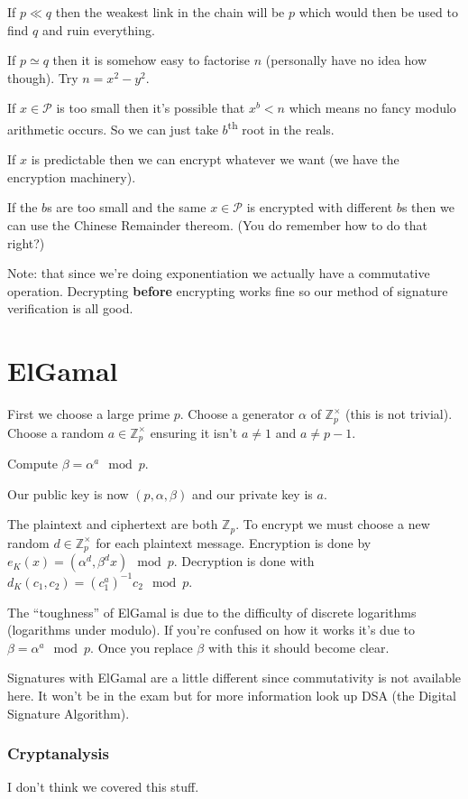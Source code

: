 \documentclass{report}
\newcommand{\ts}{\textsuperscript}
\begin{document}
If $p \ll q$ then the weakest link in the chain will be $p$ which would then be
used to find $q$ and ruin everything.

If $p \simeq q$ then it is somehow easy to factorise $n$ (personally have no
idea how though). Try $n=x^2-y^2$.

If $x \in \mathscr{P}$ is too small then it's possible that $x^b < n$ which
means no fancy modulo arithmetic occurs. So we can just take $b$\ts{th} root
in the reals.

If $x$ is predictable then we can encrypt whatever we want (we have the
encryption machinery).

If the $b$s are too small and the same $x \in \mathscr{P}$ is encrypted with
different $b$s then we can use the Chinese Remainder thereom.
(You do remember how to do that right?)

Note: that since we're doing exponentiation we actually have a commutative
operation. Decrypting \textbf{before} encrypting works fine so our method
of signature verification is all good.

\section{ElGamal}
First we choose a large prime $p$. Choose a generator $\alpha$ of
$\mathbb{Z}^\times_p$ (this is not trivial). Choose a random
$a \in \mathbb{Z}^\times_p$ ensuring it isn't $a \neq 1$ and $a \neq p-1$.

Compute $\beta = \alpha^a \mod p$.

Our public key is now $(p, \alpha, \beta)$ and our private key is $a$.

The plaintext and ciphertext are both $\mathbb{Z}_p$. To encrypt we must
choose a new random $d \in \mathbb{Z}^\times_p$ for each plaintext message.
Encryption is done by $e_K(x) = (\alpha^d, \beta^d x) \mod p$. Decryption
is done with $d_K(c_1,c_2) = {(c_1^a)}^{-1} c_2 \mod p$.

The ``toughness'' of ElGamal is due to the difficulty of discrete logarithms
(logarithms under modulo). If you're confused on how it works it's due to
$\beta = \alpha^a \mod p$. Once you replace $\beta$ with this it should
become clear.

Signatures with ElGamal are a little different since commutativity is not
available here. It won't be in the exam but for more information look up DSA
(the Digital Signature Algorithm).

\subsubsection{Cryptanalysis}
I don't think we covered this stuff.
\end{document}
